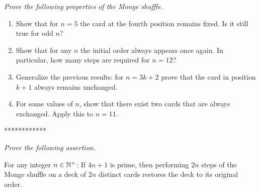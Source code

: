 \begin{enumerate}
\begin{enumerate}
{\medskip

{\em Prove the following properties of the Monge shuffle.} 

\begin{enumerate}
\item Show that for $n=5$ the card at the fourth position remains fixed.
Is it still true for odd $n$?
\item Show that for any $n$ the initial order always appears once again.
In particular, how many steps are required for $n=12$?
\item Generalize the previous results:
for $n=3k+2$ prove that the card in position $k+1$ always remains unchanged.
\item For some values of $n$, show that there exist two cards that are always exchanged. Apply this to $n=11$.
\end{enumerate}
************}

\medskip

{\em Prove the following assertion.}

\begin{prop}
For any integer $n \in \mathbb{N}^+$: 
If $4n+1$ is prime, then performing $2n$ steps of the Monge shuffle on a deck of $2n$ distinct cards restores the deck to its original order.
\end{prop}
  \end{enumerate}

\end{enumerate}


